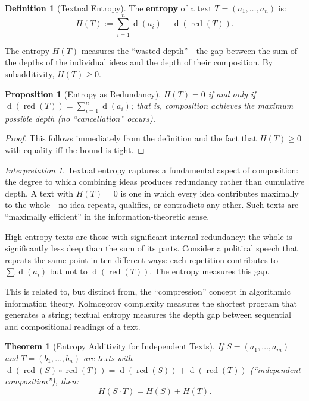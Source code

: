 \documentclass[11pt,openany]{book}
\theoremstyle{definition}
\newtheorem{definition}[axiom]{Definition}
\theoremstyle{plain}
\newtheorem{theorem}[axiom]{Theorem}
\newtheorem{proposition}[axiom]{Proposition}
\theoremstyle{remark}
\newtheorem{interpretation}[axiom]{Interpretation}
\newcommand{\compose}{\circ}                 %
\newcommand{\depth}{\operatorname{d}}       %
\begin{document}
\begin{definition}[Textual Entropy]
The \textbf{entropy} of a text $T = (a_1, \ldots, a_n)$ is:
\[
H(T) := \sum_{i=1}^{n} \depth(a_i) - \depth(\operatorname{red}(T)).
\]
\end{definition}

The entropy $H(T)$ measures the ``wasted depth''---the gap between the sum of the depths of the individual ideas and the depth of their composition. By subadditivity, $H(T) \geq 0$.

\begin{proposition}[Entropy as Redundancy]
$H(T) = 0$ if and only if $\depth(\operatorname{red}(T)) = \sum_{i=1}^n \depth(a_i)$; that is, composition achieves the maximum possible depth (no ``cancellation'' occurs).
\end{proposition}

\begin{proof}
This follows immediately from the definition and the fact that $H(T) \geq 0$ with equality iff the bound is tight.
\end{proof}

\begin{interpretation}
Textual entropy captures a fundamental aspect of composition: the degree to which combining ideas produces redundancy rather than cumulative depth. A text with $H(T) = 0$ is one in which every idea contributes maximally to the whole---no idea repeats, qualifies, or contradicts any other. Such texts are ``maximally efficient'' in the information-theoretic sense.

High-entropy texts are those with significant internal redundancy: the whole is significantly less deep than the sum of its parts. Consider a political speech that repeats the same point in ten different ways: each repetition contributes to $\sum \depth(a_i)$ but not to $\depth(\operatorname{red}(T))$. The entropy measures this gap.

This is related to, but distinct from, the ``compression'' concept in algorithmic information theory. Kolmogorov complexity measures the shortest program that generates a string; textual entropy measures the depth gap between sequential and compositional readings of a text.
\end{interpretation}

\begin{theorem}[Entropy Additivity for Independent Texts]
If $S = (a_1, \ldots, a_m)$ and $T = (b_1, \ldots, b_n)$ are texts with $\depth(\operatorname{red}(S) \compose \operatorname{red}(T)) = \depth(\operatorname{red}(S)) + \depth(\operatorname{red}(T))$ (``independent composition''), then:
\[
H(S \cdot T) = H(S) + H(T).
\]
\end{theorem}
\end{document}
